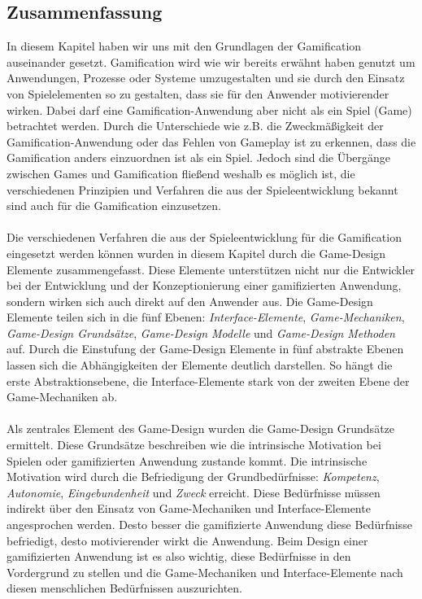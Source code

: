 \documentclass[a4paper,12pt]{scrartcl}
\begin{document}
\subsection{Zusammenfassung}
In diesem Kapitel haben wir uns mit den Grundlagen der Gamification auseinander gesetzt. Gamification wird wie wir bereits erwähnt haben genutzt um Anwendungen, Prozesse oder Systeme umzugestalten und sie durch den Einsatz von Spielelementen so zu gestalten, dass sie für den Anwender motivierender wirken. Dabei darf eine Gamification-Anwendung aber nicht als ein Spiel (Game) betrachtet werden. Durch die Unterschiede wie z.B. die Zweckmäßigkeit der Gamification-Anwendung oder das Fehlen von Gameplay ist zu erkennen, dass die Gamification anders einzuordnen ist als ein Spiel. Jedoch sind die Übergänge zwischen Games und Gamification fließend weshalb es möglich ist, die verschiedenen Prinzipien und Verfahren die aus der Spieleentwicklung bekannt sind auch für die Gamification einzusetzen.
\\\\
Die verschiedenen Verfahren die aus der Spieleentwicklung für die Gamification eingesetzt werden können wurden in diesem Kapitel durch die Game-Design Elemente zusammengefasst. Diese Elemente unterstützen nicht nur die Entwickler bei der Entwicklung und der Konzeptionierung einer gamifizierten Anwendung, sondern wirken sich auch direkt auf den Anwender aus. Die Game-Design Elemente teilen sich in die fünf Ebenen: \textit{Interface-Elemente}, \textit{Game-Mechaniken}, \textit{Game-Design Grundsätze}, \textit{Game-Design Modelle} und \textit{Game-Design Methoden} auf. Durch die Einstufung der Game-Design Elemente in fünf abstrakte Ebenen lassen sich die Abhängigkeiten der Elemente deutlich darstellen. So hängt die erste Abstraktionsebene, die Interface-Elemente stark von der zweiten Ebene der Game-Mechaniken ab.
\\\\
Als zentrales Element des Game-Design wurden die Game-Design Grundsätze ermittelt. Diese Grundsätze beschreiben wie die intrinsische Motivation bei Spielen oder gamifizierten Anwendung zustande kommt. Die intrinsische Motivation wird durch  die Befriedigung der Grundbedürfnisse: \textit{Kompetenz}, \textit{Autonomie}, \textit{Eingebundenheit} und \textit{Zweck} erreicht. Diese Bedürfnisse müssen indirekt über den Einsatz von Game-Mechaniken und Interface-Elemente angesprochen werden. Desto besser die gamifizierte Anwendung diese Bedürfnisse befriedigt, desto motivierender wirkt die Anwendung. Beim Design einer gamifizierten Anwendung ist es also wichtig, diese Bedürfnisse in den Vordergrund zu stellen und die Game-Mechaniken und Interface-Elemente nach diesen menschlichen Bedürfnissen auszurichten.
\end{document}
